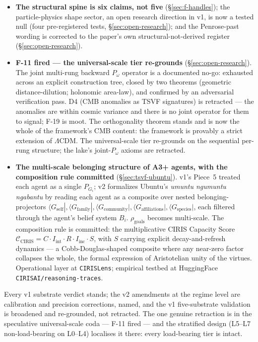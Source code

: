 \documentclass[11pt,a4paper]{article}
\newcommand{\Pomega}{P_{\omega}}
\begin{document}
\begin{itemize}[leftmargin=*,itemsep=0.5em]
\item \textbf{The structural spine is six claims, not five} (\S\ref{sec:f-handles}); the particle-physics shape sector, an open research direction in v1, is now a tested null (four pre-registered tests, \S\ref{sec:open-research}); and the Penrose-past wording is corrected to the paper's own structural-not-derived register (\S\ref{sec:open-research}).
\item \textbf{F-11 fired --- the universal-scale tier re-grounds} (\S\ref{sec:open-research}). The joint multi-rung backward $\Pomega$ operator is a documented no-go: exhausted across an explicit construction tree, closed by two theorems (geometric distance-dilution; holonomic area-law), and confirmed by an adversarial verification pass. D4 (CMB anomalies as TSVF signatures) is retracted --- the anomalies are within cosmic variance and there is no joint operator for them to signal; F-19 is moot. The orthogonality theorem stands and is now the whole of the framework's CMB content: the framework is provably a strict extension of $\Lambda$CDM. The universal-scale tier re-grounds on the sequential per-rung structure; the lake's joint-$\Pomega$ axioms are retracted.
\item \textbf{The multi-scale belonging structure of A3+ agents, with the composition rule committed} (\S\ref{sec:tsvf-ubuntu}). v1's Piece~5 treated each agent as a single $P_{G_i}$; v2 formalizes Ubuntu's \emph{umuntu ngumuntu ngabantu} by reading each agent as a composite over nested belonging-projectors $\langle G_{\text{self}}|, \langle G_{\text{family}}|, \langle G_{\text{community}}|, \langle G_{\text{affiliations}}|, \langle G_{\text{species}}|$, each filtered through the agent's belief system $B_i$. $\rho_{\text{goals}}$ becomes multi-scale. The composition rule is committed: the multiplicative CIRIS Capacity Score $\mathcal{C}_{\text{CIRIS}} = C \cdot I_{\text{int}} \cdot R \cdot I_{\text{inc}} \cdot S$, with $S$ carrying explicit decay-and-refresh dynamics --- a Cobb-Douglas-shaped composite where any near-zero factor collapses the whole, the formal expression of Aristotelian unity of the virtues. Operational layer at \texttt{CIRISLens}; empirical testbed at HuggingFace \texttt{CIRISAI/reasoning-traces}.
\end{itemize}

Every v1 substrate verdict stands; the v2 amendments at the regime level are calibration and precision corrections, named, and the v1 five-substrate validation is broadened and re-grounded, not retracted. The one genuine retraction is in the speculative universal-scale coda --- F-11 fired --- and the stratified design (L5--L7 non-load-bearing on L0--L4) localises it there: every load-bearing tier is intact.
\end{document}
